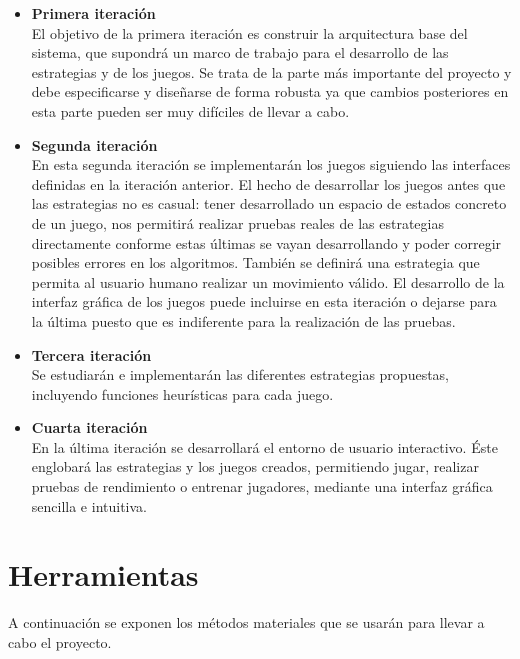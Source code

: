 \documentclass[a4paper,12pt]{article}
\begin{document}
\begin{itemize}
	\item \textbf{Primera iteración}\\
	El objetivo de la primera iteración es construir la arquitectura base del sistema, que supondrá un marco de trabajo para el desarrollo de las estrategias y de los juegos.
	Se trata de la parte más importante del proyecto y debe especificarse y diseñarse de forma robusta ya que cambios posteriores en esta parte pueden ser muy difíciles de llevar a cabo.
	
	\item \textbf{Segunda iteración}\\
	En esta segunda iteración se implementarán los juegos siguiendo las interfaces definidas en la iteración anterior.
	El hecho de desarrollar los juegos antes que las estrategias no es casual: tener desarrollado un espacio de estados concreto de un juego, nos permitirá realizar pruebas reales de las estrategias directamente conforme estas últimas se vayan desarrollando y poder corregir posibles errores en los algoritmos.
	También se definirá una estrategia que permita al usuario humano realizar un movimiento válido.
	El desarrollo de la interfaz gráfica de los juegos puede incluirse en esta iteración o dejarse para la última puesto que es indiferente para la realización de las pruebas.
	
	\item \textbf{Tercera iteración}\\
	Se estudiarán e implementarán las diferentes estrategias propuestas, incluyendo funciones heurísticas para cada juego.
	
	\item \textbf{Cuarta iteración}\\
	En la última iteración se desarrollará el entorno de usuario interactivo.
	Éste englobará las estrategias y los juegos creados, permitiendo jugar, realizar pruebas de rendimiento o entrenar jugadores, mediante una interfaz gráfica sencilla e intuitiva.
	
	
\end{itemize}

\section{Herramientas}
\par 
A continuación se exponen los métodos materiales que se usarán para llevar a cabo el proyecto.
\end{document}
